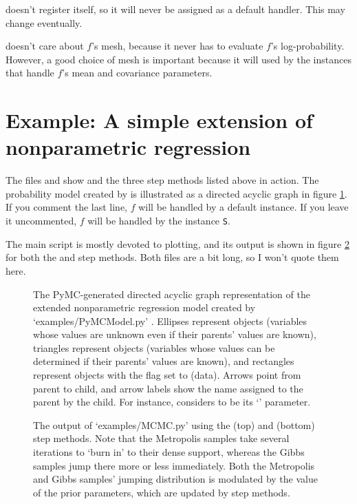  doesn't register itself, so it will never be assigned as a default handler. This may change eventually.

 doesn't care about $f$'s mesh, because it never has to evaluate $f$'s log-probability. However, a good choice of mesh is important because it will used by the  instances that handle $f$'s mean and covariance parameters.

\section{Example: A simple extension of nonparametric regression}\label{sub:BasicMCMC}
The files  and  show  and the three step methods listed above in action. The probability model created by  is illustrated as a directed acyclic graph in figure \ref{fig:unobservedModel}. If you comment the last line, $f$ will be handled by a default  instance. If you leave it uncommented, $f$ will be handled by the  instance \texttt{S}.

The main script  is mostly devoted to plotting, and its output is shown in figure \ref{fig:MCMCOutput} for both the  and  step methods. Both files are a bit long, so I won't quote them here.
% 

\begin{figure}
    \centering
    \caption{The PyMC-generated directed acyclic graph representation of the extended nonparametric regression model created by \textsf{`examples/PyMCModel.py'} . Ellipses represent  objects (variables whose values are unknown even if their parents' values are known), triangles represent  objects (variables whose values can be determined if their parents' values are known), and rectangles represent  objects with the  flag set to  (data). Arrows point from parent to child, and arrow labels show the name assigned to the parent by the child. For instance,  considers  to be its `' parameter.}
    \label{fig:unobservedModel}
\end{figure}

\begin{figure}
    \centering
    \caption{The output of {\sffamily `examples/MCMC.py'} using the  (top) and  (bottom) step methods. Note that the Metropolis samples take several iterations to `burn in' to their dense support, whereas the Gibbs samples jump there more or less immediately. Both the Metropolis and Gibbs samples' jumping distribution is modulated by the value of the prior parameters, which are updated by  step methods.}
    \label{fig:MCMCOutput}
\end{figure}

